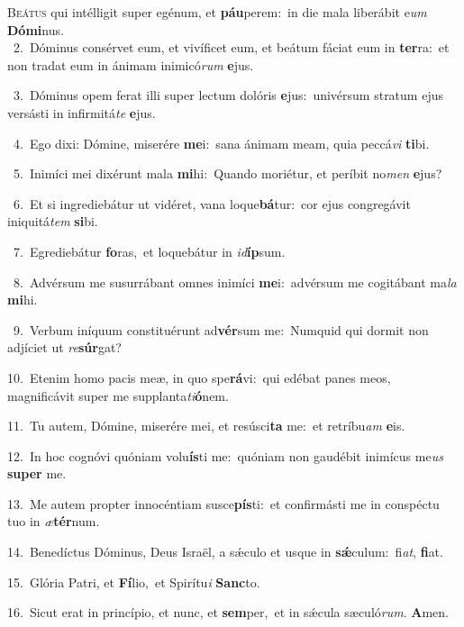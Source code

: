 \lettrine{\initial\textcolor{\initialcolor}{B}}{eátus} qui intélligit super egénum, et \textbf{páu}\-perem:~\star in die mala liberábit e\textit{um} \textbf{Dó}\-\textbf{mi}nus.\\
{\numbfont\textcolor{\numbcolor}{~2.}}~Dóminus consérvet eum, et vivíficet eum, et beátum fáciat eum in \textbf{ter}\-ra:~\star et non tradat eum in ánimam inimicó\textit{rum} \textbf{e}\-jus.\par
{\numbfont\textcolor{\numbcolor}{~3.}}~Dóminus opem ferat illi super lectum dolóris \textbf{e}\-jus:~\star univérsum stratum ejus versásti in infirmitá\textit{te} \textbf{e}\-jus.\par
{\numbfont\textcolor{\numbcolor}{~4.}}~Ego dixi: Dómine, miserére \textbf{me}\-i:~\star sana ánimam meam, quia peccá\textit{vi} \textbf{ti}\-bi.\par
{\numbfont\textcolor{\numbcolor}{~5.}}~Inimíci mei dixérunt mala \textbf{mi}\-hi:~\star Quando moriétur, et períbit no\textit{men} \textbf{e}\-jus?\par
{\numbfont\textcolor{\numbcolor}{~6.}}~Et si ingrediebátur ut vidéret, vana loque\-\textbf{bá}\-tur:~\star cor ejus congregávit iniquitá\textit{tem} \textbf{si}\-bi.\par
{\numbfont\textcolor{\numbcolor}{~7.}}~Egrediebátur \textbf{fo}\-ras,~\star et loquebátur in \textit{id}\-\textbf{íp}sum.\par
{\numbfont\textcolor{\numbcolor}{~8.}}~Advérsum me susurrábant omnes inimíci \textbf{me}\-i:~\star advérsum me cogitábant ma\textit{la} \textbf{mi}\-hi.\par
{\numbfont\textcolor{\numbcolor}{~9.}}~Verbum iníquum constituérunt ad\-\textbf{vér}\-sum me:~\star Numquid qui dormit non adjíciet ut \textit{re}\-\textbf{súr}gat?\par
{\numbfont\textcolor{\numbcolor}{10.}}~Etenim homo pacis meæ, in quo spe\-\textbf{rá}\-vi:~\star qui edébat panes meos, magnificávit super me supplanta\-\textit{ti}\-\textbf{ó}nem.\par
{\numbfont\textcolor{\numbcolor}{11.}}~Tu autem, Dómine, miserére mei, et resúsci\textbf{ta} me:~\star et retríbu\textit{am} \textbf{e}\-is.\par
{\numbfont\textcolor{\numbcolor}{12.}}~In hoc cognóvi quóniam volu\-\textbf{ís}\-ti me:~\star quóniam non gaudébit inimícus me\textit{us} \textbf{su}\-\textbf{per} me.\par
{\numbfont\textcolor{\numbcolor}{13.}}~Me autem propter innocéntiam susce\-\textbf{pís}\-ti:~\star et confirmásti me in conspéctu tuo in \textit{æ}\-\textbf{tér}num.\par
{\numbfont\textcolor{\numbcolor}{14.}}~Benedíctus Dóminus, Deus Israël, a sǽculo et usque in \textbf{sǽ}\-culum:~\star fi\-\textit{at}\-, \textbf{fi}\-at.\par
{\numbfont\textcolor{\numbcolor}{15.}}~Glória Patri, et \textbf{Fí}\-lio,~\star et Spirítu\textit{i} \textbf{Sanc}\-to.\par
{\numbfont\textcolor{\numbcolor}{16.}}~Sicut erat in princípio, et nunc, et \textbf{sem}\-per,~\star et in sǽcula sæculó\-\textit{rum}\-. \textbf{A}\-men.\par
